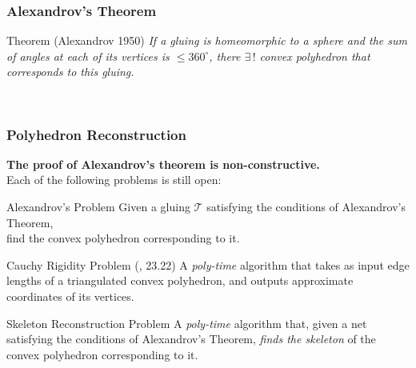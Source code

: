 \begin{frame}
\frametitle{Alexandrov's Theorem}

\vspace{3.8mm}

\begin{block}{Theorem ({\scriptsize Alexandrov 1950})}
	\itshape
	If a gluing is homeomorphic to a sphere and the sum of angles at each of its vertices is
	$\le 360^\circ$\!, there $\exists\,!$ convex polyhedron that corresponds to this gluing.
\end{block} \medskip

\begin{figure}
	\centering
	\begin{subfigure}[m]{0.46\textwidth}
		\centering
		
	\end{subfigure}
~
	\centering
	\begin{subfigure}[m]{0.46\textwidth}
		\centering
		
	\end{subfigure}
\end{figure}

\end{frame}


\begin{frame} \frametitle{Polyhedron Reconstruction}

\textcolor{hard}{\bf The proof of Alexandrov's theorem is non-constructive.} \\
Each of the following problems is still open:

\smallskip

\begin{block}{Alexandrov's Problem} \small
	Given a gluing $\mathcal T$ satisfying the conditions of Alexandrov's Theorem, \\
	find the convex polyhedron corresponding to it.
\end{block}

\begin{block}{Cauchy Rigidity Problem ({\scriptsize {}, 23.22})} \small
	A {\itshape poly-time} algorithm that takes as input edge lengths of a triangulated
	convex polyhedron, and outputs approximate coordinates of its vertices.
\end{block}

\begin{block}{Skeleton Reconstruction Problem} \small
	A {\itshape poly-time} algorithm that, given a net satisfying the conditions of
	Alexandrov's Theorem, {\itshape finds the skeleton} of the
	convex polyhedron corresponding to it.
\end{block} \vspace{2.5mm}
\end{frame}

